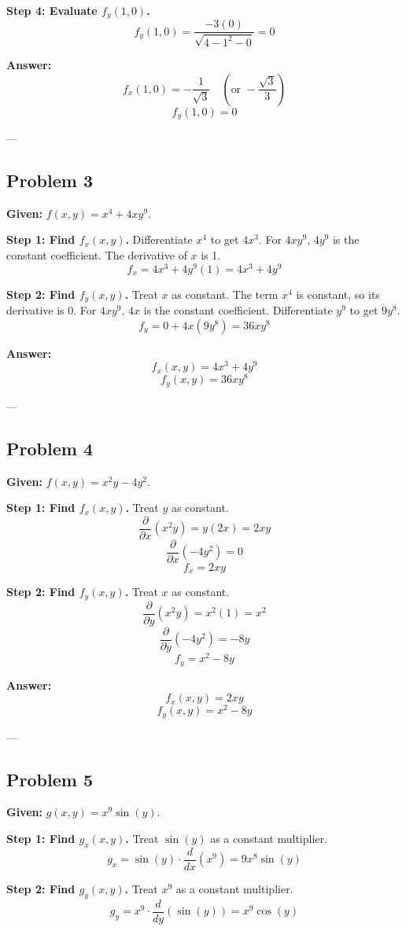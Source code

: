 \documentclass{article}
\begin{document}
\textbf{Step 4: Evaluate $f_y(1, 0)$.}
\[ f_y(1, 0) = \frac{-3(0)}{\sqrt{4 - 1^2 - 0}} = 0 \]

\textbf{Answer:}
\[ f_x(1, 0) = -\frac{1}{\sqrt{3}} \quad (\text{or } -\frac{\sqrt{3}}{3}) \]
\[ f_y(1, 0) = 0 \]

---

\subsection*{Problem 3}
\textbf{Given:} $f(x, y) = x^4 + 4xy^9$.

\textbf{Step 1: Find $f_x(x, y)$.}
Differentiate $x^4$ to get $4x^3$.
For $4xy^9$, $4y^9$ is the constant coefficient. The derivative of $x$ is 1.
\[ f_x = 4x^3 + 4y^9(1) = 4x^3 + 4y^9 \]

\textbf{Step 2: Find $f_y(x, y)$.}
Treat $x$ as constant. The term $x^4$ is constant, so its derivative is 0.
For $4xy^9$, $4x$ is the constant coefficient. Differentiate $y^9$ to get $9y^8$.
\[ f_y = 0 + 4x(9y^8) = 36xy^8 \]

\textbf{Answer:}
\[ f_x(x, y) = 4x^3 + 4y^9 \]
\[ f_y(x, y) = 36xy^8 \]

---

\subsection*{Problem 4}
\textbf{Given:} $f(x, y) = x^2y - 4y^2$.

\textbf{Step 1: Find $f_x(x, y)$.}
Treat $y$ as constant.
\[ \frac{\partial}{\partial x}(x^2y) = y(2x) = 2xy \]
\[ \frac{\partial}{\partial x}(-4y^2) = 0 \]
\[ f_x = 2xy \]

\textbf{Step 2: Find $f_y(x, y)$.}
Treat $x$ as constant.
\[ \frac{\partial}{\partial y}(x^2y) = x^2(1) = x^2 \]
\[ \frac{\partial}{\partial y}(-4y^2) = -8y \]
\[ f_y = x^2 - 8y \]

\textbf{Answer:}
\[ f_x(x, y) = 2xy \]
\[ f_y(x, y) = x^2 - 8y \]

---

\subsection*{Problem 5}
\textbf{Given:} $g(x, y) = x^9 \sin(y)$.

\textbf{Step 1: Find $g_x(x, y)$.}
Treat $\sin(y)$ as a constant multiplier.
\[ g_x = \sin(y) \cdot \frac{d}{dx}(x^9) = 9x^8 \sin(y) \]

\textbf{Step 2: Find $g_y(x, y)$.}
Treat $x^9$ as a constant multiplier.
\[ g_y = x^9 \cdot \frac{d}{dy}(\sin(y)) = x^9 \cos(y) \]
\end{document}
